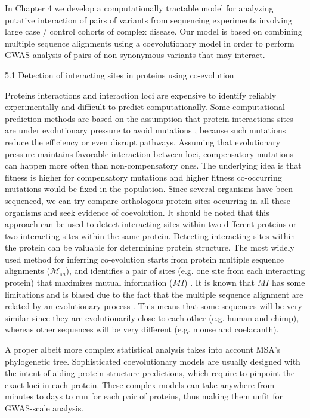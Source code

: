 In Chapter 4 we develop a computationally tractable model for analyzing putative interaction of pairs of variants from sequencing experiments involving large case / control cohorts of complex disease. Our model is based on combining multiple sequence alignments using a coevolutionary model in order to perform GWAS analysis of pairs of non-synonymous variants that may interact.

5.1 Detection of interacting sites in proteins using co-evolution

Proteins interactions and interaction loci are expensive to identify reliably experimentally and difficult to predict computationally. Some computational prediction methods are based on the assumption that protein interactions sites are under evolutionary pressure to avoid mutations \cite{marks2012protein}, because such mutations reduce the efficiency or even disrupt pathways. Assuming that evolutionary pressure maintains favorable interaction between loci, compensatory mutations can happen more often than non-compensatory ones. The underlying idea is that fitness is higher for compensatory mutations and higher fitness co-occurring mutations would be fixed in the population. Since several organisms have been sequenced, we can try compare orthologous protein sites occurring in all these organisms and seek evidence of coevolution. It should be noted that this approach can be used to detect interacting sites within two different proteins or two interacting sites within the same protein. Detecting interacting sites within the protein can be valuable for determining protein structure. The most widely used method for inferring co-evolution starts from protein multiple sequence alignments ($\mathcal{M}_{sa}$), and identifies a pair of sites (e.g. one site from each interacting protein) that maximizes mutual information ($MI$) \cite{marks2012protein}. It is known that $MI$ has some limitations  \cite{dunn2008mutual} and is biased due to the fact that the multiple sequence alignment are related by an evolutionary process \cite{dunn2008mutual}. This means that some sequences will be very similar since they are evolutionarily close to each other (e.g. human and chimp), whereas other sequences will be very different (e.g. mouse and coelacanth). 

A proper albeit more complex statistical analysis takes into account MSA’s phylogenetic tree.  Sophisticated coevolutionary models are usually designed with the intent of aiding protein structure predictions, which require to pinpoint the exact loci in each protein. These complex models can take anywhere from minutes to days to run for each pair of proteins, thus making them unfit for GWAS-scale analysis. 

